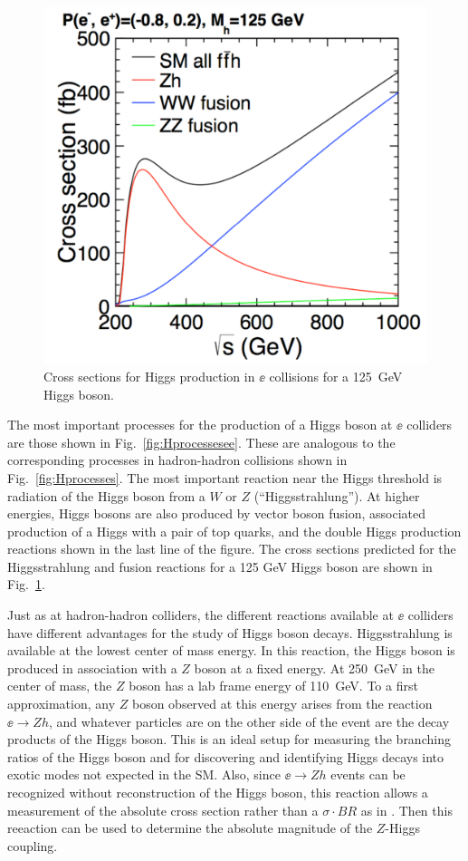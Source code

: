 \documentclass[12pt]{article}
\begin{document}
\begin{figure}
\begin{center}
\includegraphics[width=0.55\hsize]{eeHiggscs.pdf}
\end{center}
\caption{Cross sections for Higgs production in $\ee$ collisions 
for a 125~GeV Higgs
  boson.}
\label{fig:Higgscsee}
\end{figure}


The most important processes for the production of a
Higgs boson at $\ee$ colliders  are those shown in
Fig.~\ref{fig:Hprocessesee}.
These are analogous to the corresponding processes in hadron-hadron
collisions shown in Fig.~\ref{fig:Hprocesses}.   The most important
reaction
near the Higgs threshold is radiation of the Higgs boson
from a $W$ or $Z$ (``Higgsstrahlung'').   At higher energies, Higgs
bosons are also produced by vector boson fusion, associated production
of a Higgs with a pair of top quarks, and the double Higgs production
reactions shown in the last line of the figure.  The cross sections predicted
for the Higgsstrahlung and fusion reactions  for a 125 GeV Higgs boson 
are shown in
Fig.~\ref{fig:Higgscsee}. 

Just as at hadron-hadron colliders, the different reactions available
at $\ee$ colliders have different advantages for the study of Higgs
boson decays.   Higgsstrahlung is available at the lowest center of
mass energy.  In this reaction, the Higgs boson is produced in association with
a $Z$ boson at a fixed  energy.    At 250~GeV in the center of
mass, the $Z$ boson has a lab frame energy of 110~GeV.  To a first
approximation, any $Z$ boson observed at this energy arises from the 
reaction $\ee\to Zh$, and whatever particles are  on the other side of the event
are the decay products of the Higgs boson.    This is an ideal setup
for measuring the branching ratios of the Higgs boson and for
discovering and identifying Higgs decays into exotic modes not
expected in the SM.  Also, since $\ee\to
Zh$ events can be recognized without reconstruction of the Higgs boson, this 
reaction allows a measurement of the absolute cross section rather
than a $\sigma\cdot BR$ as in .   Then this
reeaction
 can be used to determine the absolute magnitude of the
$Z$-Higgs
coupling.
\end{document}
